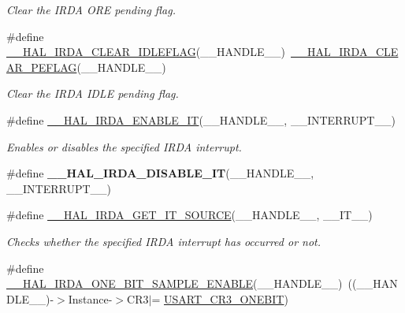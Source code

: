 \begin{DoxyCompactItemize}
\begin{DoxyCompactList}\small\item\em Clear the I\+R\+DA O\+RE pending flag. \end{DoxyCompactList}\item 
\#define \hyperlink{group___i_r_d_a___exported___macros_ga8fe7de0106f994c56fdff184215dbcbf}{\+\_\+\+\_\+\+H\+A\+L\+\_\+\+I\+R\+D\+A\+\_\+\+C\+L\+E\+A\+R\+\_\+\+I\+D\+L\+E\+F\+L\+AG}(\+\_\+\+\_\+\+H\+A\+N\+D\+L\+E\+\_\+\+\_\+)~\hyperlink{group___i_r_d_a___exported___macros_gae69bd04d655a956dba913c52638de303}{\+\_\+\+\_\+\+H\+A\+L\+\_\+\+I\+R\+D\+A\+\_\+\+C\+L\+E\+A\+R\+\_\+\+P\+E\+F\+L\+AG}(\+\_\+\+\_\+\+H\+A\+N\+D\+L\+E\+\_\+\+\_\+)
\begin{DoxyCompactList}\small\item\em Clear the I\+R\+DA I\+D\+LE pending flag. \end{DoxyCompactList}\item 
\#define \hyperlink{group___i_r_d_a___exported___macros_gae9ccdc86c1bcb8ed3857474d8c3823fa}{\+\_\+\+\_\+\+H\+A\+L\+\_\+\+I\+R\+D\+A\+\_\+\+E\+N\+A\+B\+L\+E\+\_\+\+IT}(\+\_\+\+\_\+\+H\+A\+N\+D\+L\+E\+\_\+\+\_\+,  \+\_\+\+\_\+\+I\+N\+T\+E\+R\+R\+U\+P\+T\+\_\+\+\_\+)
\begin{DoxyCompactList}\small\item\em Enables or disables the specified I\+R\+DA interrupt. \end{DoxyCompactList}\item 
\#define {\bfseries \+\_\+\+\_\+\+H\+A\+L\+\_\+\+I\+R\+D\+A\+\_\+\+D\+I\+S\+A\+B\+L\+E\+\_\+\+IT}(\+\_\+\+\_\+\+H\+A\+N\+D\+L\+E\+\_\+\+\_\+,  \+\_\+\+\_\+\+I\+N\+T\+E\+R\+R\+U\+P\+T\+\_\+\+\_\+)
\item 
\#define \hyperlink{group___i_r_d_a___exported___macros_ga1c50dd0407d6e4159f90c9bc74545925}{\+\_\+\+\_\+\+H\+A\+L\+\_\+\+I\+R\+D\+A\+\_\+\+G\+E\+T\+\_\+\+I\+T\+\_\+\+S\+O\+U\+R\+CE}(\+\_\+\+\_\+\+H\+A\+N\+D\+L\+E\+\_\+\+\_\+,  \+\_\+\+\_\+\+I\+T\+\_\+\+\_\+)
\begin{DoxyCompactList}\small\item\em Checks whether the specified I\+R\+DA interrupt has occurred or not. \end{DoxyCompactList}\item 
\#define \hyperlink{group___i_r_d_a___exported___macros_ga2af9a200c672b78abfec855501b15fe9}{\+\_\+\+\_\+\+H\+A\+L\+\_\+\+I\+R\+D\+A\+\_\+\+O\+N\+E\+\_\+\+B\+I\+T\+\_\+\+S\+A\+M\+P\+L\+E\+\_\+\+E\+N\+A\+B\+LE}(\+\_\+\+\_\+\+H\+A\+N\+D\+L\+E\+\_\+\+\_\+)~((\+\_\+\+\_\+\+H\+A\+N\+D\+L\+E\+\_\+\+\_\+)-\/$>$Instance-\/$>$C\+R3$\vert$= \hyperlink{group___peripheral___registers___bits___definition_ga9a96fb1a7beab602cbc8cb0393593826}{U\+S\+A\+R\+T\+\_\+\+C\+R3\+\_\+\+O\+N\+E\+B\+IT})

\end{DoxyCompactItemize}

